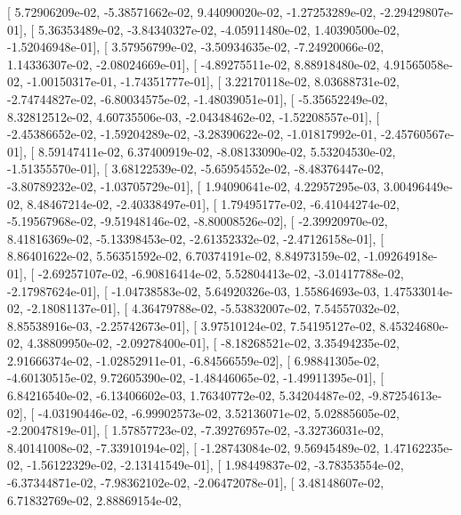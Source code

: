 \documentclass{article}
\begin{document}
       [  5.72906209e-02,  -5.38571662e-02,   9.44090020e-02,
         -1.27253289e-02,  -2.29429807e-01],
       [  5.36353489e-02,  -3.84340327e-02,  -4.05911480e-02,
          1.40390500e-02,  -1.52046948e-01],
       [  3.57956799e-02,  -3.50934635e-02,  -7.24920066e-02,
          1.14336307e-02,  -2.08024669e-01],
       [ -4.89275511e-02,   8.88918480e-02,   4.91565058e-02,
         -1.00150317e-01,  -1.74351777e-01],
       [  3.22170118e-02,   8.03688731e-02,  -2.74744827e-02,
         -6.80034575e-02,  -1.48039051e-01],
       [ -5.35652249e-02,   8.32812512e-02,   4.60735506e-03,
         -2.04348462e-02,  -1.52208557e-01],
       [ -2.45386652e-02,  -1.59204289e-02,  -3.28390622e-02,
         -1.01817992e-01,  -2.45760567e-01],
       [  8.59147411e-02,   6.37400919e-02,  -8.08133090e-02,
          5.53204530e-02,  -1.51355570e-01],
       [  3.68122539e-02,  -5.65954552e-02,  -8.48376447e-02,
         -3.80789232e-02,  -1.03705729e-01],
       [  1.94090641e-02,   4.22957295e-03,   3.00496449e-02,
          8.48467214e-02,  -2.40338497e-01],
       [  1.79495177e-02,  -6.41044274e-02,  -5.19567968e-02,
         -9.51948146e-02,  -8.80008526e-02],
       [ -2.39920970e-02,   8.41816369e-02,  -5.13398453e-02,
         -2.61352332e-02,  -2.47126158e-01],
       [  8.86401622e-02,   5.56351592e-02,   6.70374191e-02,
          8.84973159e-02,  -1.09264918e-01],
       [ -2.69257107e-02,  -6.90816414e-02,   5.52804413e-02,
         -3.01417788e-02,  -2.17987624e-01],
       [ -1.04738583e-02,   5.64920326e-03,   1.55864693e-03,
          1.47533014e-02,  -2.18081137e-01],
       [  4.36479788e-02,  -5.53832007e-02,   7.54557032e-02,
          8.85538916e-03,  -2.25742673e-01],
       [  3.97510124e-02,   7.54195127e-02,   8.45324680e-02,
          4.38809950e-02,  -2.09278400e-01],
       [ -8.18268521e-02,   3.35494235e-02,   2.91666374e-02,
         -1.02852911e-01,  -6.84566559e-02],
       [  6.98841305e-02,  -4.60130515e-02,   9.72605390e-02,
         -1.48446065e-02,  -1.49911395e-01],
       [  6.84216540e-02,  -6.13406602e-03,   1.76340772e-02,
          5.34204487e-02,  -9.87254613e-02],
       [ -4.03190446e-02,  -6.99902573e-02,   3.52136071e-02,
          5.02885605e-02,  -2.20047819e-01],
       [  1.57857723e-02,  -7.39276957e-02,  -3.32736031e-02,
          8.40141008e-02,  -7.33910194e-02],
       [ -1.28743084e-02,   9.56945489e-02,   1.47162235e-02,
         -1.56122329e-02,  -2.13141549e-01],
       [  1.98449837e-02,  -3.78353554e-02,  -6.37344871e-02,
         -7.98362102e-02,  -2.06472078e-01],
       [  3.48148607e-02,   6.71832769e-02,   2.88869154e-02,
\end{document}
